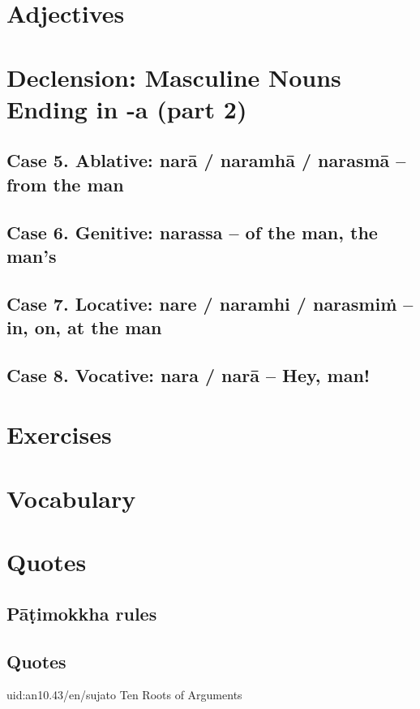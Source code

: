 \documentclass[11pt,oneside]{memoir}
\begin{document}
\section{Adjectives}
\label{sec:orgb589ac0}
\section{Declension: Masculine Nouns Ending in -a (part 2)}
\label{sec:org1828699}
\subsection{Case 5. Ablative: narā / naramhā / narasmā -- from the man}
\label{sec:orgc76e8f5}
\subsection{Case 6. Genitive: narassa -- of the man, the man's}
\label{sec:org8007868}
\subsection{Case 7. Locative: nare / naramhi / narasmiṁ -- in, on, at the man}
\label{sec:org5f5ce34}
\subsection{Case 8. Vocative: nara / narā -- Hey, man!}
\label{sec:org26e22cd}
\section{Exercises}
\label{sec:org82a87a0}
\section{Vocabulary}
\label{sec:orgba716de}
\section{Quotes}
\label{sec:org8894b3a}
\subsection{Pāṭimokkha rules}
\label{sec:org38a48d2}
\subsection{Quotes}
\label{sec:orgb5983f5}

uid:an10.43/en/sujato Ten Roots of Arguments
\end{document}
